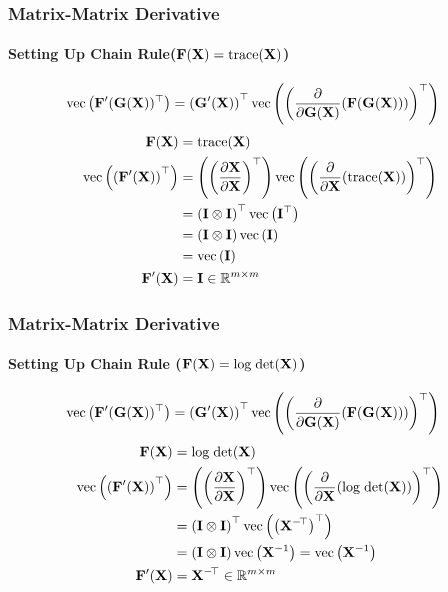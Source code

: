 \begin{frame}
\frametitle{Matrix-Matrix Derivative}
\framesubtitle{Setting Up Chain Rule($\mathbf{F}(\mathbf{X}) = \mathop{\mathrm{trace}}(\mathbf{X})$)}
%
\footnotesize
\colorbox{green!10}{\vbox{
\textcolor{m1}{
\begin{align*}
\mathrm{vec}\left(\mathbf{F}'(\mathbf{G}(\mathbf{X}))^\top \right) &= 
               \left(\mathbf{G}'(\mathbf{X})\right)^\top
\mathrm{vec}\left(
      \left(\frac{\partial}{\partial\mathbf{G}(\mathbf{X})}(\mathbf{F}(\mathbf{G}(\mathbf{X})))\right)^\top
      \right)
\end{align*}
} %
} }
\normalsize
\footnotesize
\textcolor{m1}{
\begin{align*}
\mathbf{F}(\mathbf{X}) &= \mathop{\mathrm{trace}}(\mathbf{X}) \\
\mathrm{vec} \left(\left(\mathbf{F}'(\mathbf{X})\right)^\top\right) &= 
       \left(\left(\frac{\partial\mathbf{X}}{\partial\mathbf{X}}\right)^\top\right)
    \mathrm{vec}\left(
      \left(\frac{\partial}{\partial\mathbf{X}}(\mathop{\mathrm{trace}}(\mathbf{X}))\right)^\top
    \right) \\
          &= \left(\mathbf{I}\otimes{}\mathbf{I}\right)^\top \mathrm{vec}\left(\mathbf{I}^\top\right)\\
          &= \left(\mathbf{I}\otimes{}\mathbf{I}\right) \mathrm{vec}\left(\mathbf{I}\right) \\
          &= \mathrm{vec}\left(\mathbf{I}\right) \\
\mathbf{F}'(\mathbf{X}) &= \mathbf{I} \in{} \mathbb{R}^{m\times{}m}
\end{align*}
} %
\normalsize
%
\end{frame}

\begin{frame}
\frametitle{Matrix-Matrix Derivative}
\framesubtitle{Setting Up Chain Rule ($\mathbf{F}(\mathbf{X}) = \mathrm{log\;det}(\mathbf{X})$)}
%
\footnotesize
\colorbox{green!10}{\vbox{
\textcolor{m1}{
\begin{align*}
\mathrm{vec}\left(\mathbf{F}'(\mathbf{G}(\mathbf{X}))^\top \right) &= 
               \left(\mathbf{G}'(\mathbf{X})\right)^\top
\mathrm{vec}\left(
      \left(\frac{\partial}{\partial\mathbf{G}(\mathbf{X})}(\mathbf{F}(\mathbf{G}(\mathbf{X})))\right)^\top
      \right)
\end{align*}
} %
} }
\normalsize
\footnotesize
\textcolor{m1}{
\begin{align*}
\mathbf{F}(\mathbf{X}) &= \mathrm{log\;det}(\mathbf{X}) \\
\mathrm{vec} \left(\left(\mathbf{F}'(\mathbf{X})\right)^\top\right) &= 
       \left(\left(\frac{\partial\mathbf{X}}{\partial\mathbf{X}}\right)^\top\right)
    \mathrm{vec}\left(
      \left(\frac{\partial}{\partial\mathbf{X}}(\mathrm{log\;det}(\mathbf{X}))\right)^\top
    \right) \\
          &= \left(\mathbf{I}\otimes{}\mathbf{I}\right)^\top \mathrm{vec}\left(
                              \left(\mathbf{X}^{-\!\top}\right)^\top\right)\\
          &= \left(\mathbf{I}\otimes{}\mathbf{I}\right) \mathrm{vec}\left( \mathbf{X}^{-1} \right)
          = \mathrm{vec}\left( \mathbf{X}^{-1} \right)\\
 \mathbf{F}'(\mathbf{X})&= \mathbf{X}^{-\!\top} \in{} \mathbb{R}^{m\times{}m}
\end{align*}
} %
\normalsize
%
\end{frame}


